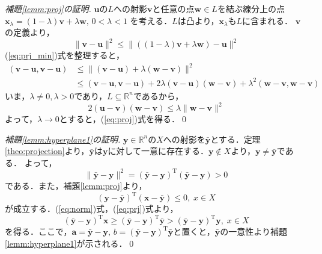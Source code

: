 \documentclass[dvipdfmx]{jsreport}
\begin{document}
\begin{proof}[補題\ref{lemm:proj}の証明]
  $\bm{u}$の$L$への射影$\bm{v}$と任意の点$\bm{w} \in L$を結ぶ線分上の点
  $\bm{x}_{\lambda} = (1 - \lambda)\bm{v} + \lambda \bm{w}, \, 0 < \lambda < 1$
  を考える．$L$は凸より，$\bm{x}_{\lambda}$も$L$に含まれる．
  $\bm{v}$の定義より，
  \begin{equation}\label{eq:prj_min}
    \|\bm{v} - \bm{u}\|^2 \leq \|((1 - \lambda)\bm{v} + \lambda \bm{w}) - \bm{u} \|^2
  \end{equation}
  (\ref{eq:prj_min})式を整理すると，
  \begin{align}
    (\bm{v}- \bm{u}, \bm{v}- \bm{u}) &\leq \|(\bm{v} - \bm{u}) + \lambda(\bm{w} - \bm{v}) \|^2 \nonumber \\
    &\leq (\bm{v}- \bm{u}, \bm{v}- \bm{u}) + 2\lambda(\bm{v} - \bm{u})(\bm{w} - \bm{v}) + \lambda^2(\bm{w} - \bm{v}, \bm{w} - \bm{v}) \nonumber
  \end{align}
  いま，$\lambda \neq 0, \lambda > 0$であり，$L \subseteq \mathbb{R}^n$であるから，
  \begin{equation}
    2(\bm{u} - \bm{v})(\bm{w} - \bm{v}) \leq \lambda \|\bm{w} - \bm{v}\|^2 \nonumber
  \end{equation}
  よって，$\lambda \rightarrow 0$とすると，(\ref{eq:proj})式を得る．\qed
\end{proof}

\begin{proof}[補題\ref{lemm:hyperplane1}の証明]
  $\bm{y} \in \mathbb{R}^n$の$X$への射影を$\bar{\bm{y}}$とする．定理\ref{theo:projection}より，$\bar{\bm{y}}$は$\bm{y}$に対して一意に存在する．$\bm{y} \notin X$より，$\bm{y} \neq \bar{\bm{y}}$である．
  よって，
  \begin{equation}\label{eq:norm}
    \|\bar{\bm{y}} - \bm{y}\|^2 = (\bar{\bm{y}} - \bm{y})^{\mathrm{T}}(\bar{\bm{y}} - \bm{y}) > 0
  \end{equation}
  である．また，補題\ref{lemm:proj}より，
  \begin{equation}\label{eq:prj}
    (\bm{y} - \bar{\bm{y}})^{\mathrm{T}}(\bm{x} - \bar{\bm{y}}) \leq 0, \; x \in X
  \end{equation}
  が成立する．(\ref{eq:norm})式，(\ref{eq:prj})式より，
  \begin{equation}
    (\bar{\bm{y}} - \bm{y})^{\mathrm{T}} \bm{x} \geq (\bar{\bm{y}} - \bm{y})^{\mathrm{T}} \bar{\bm{y}} > (\bar{\bm{y}} - \bm{y})^{\mathrm{T}} \bm{y}, \; x \in X \nonumber
  \end{equation}
  を得る．ここで，$\bm{a} = \bar{\bm{y}} - \bm{y}, \, b = (\bar{\bm{y}} - \bm{y})^{\mathrm{T}} \bar{\bm{y}}$と置くと，$\bar{\bm{y}}$の一意性より補題\ref{lemm:hyperplane1}が示される．\qed
\end{proof}
\end{document}
